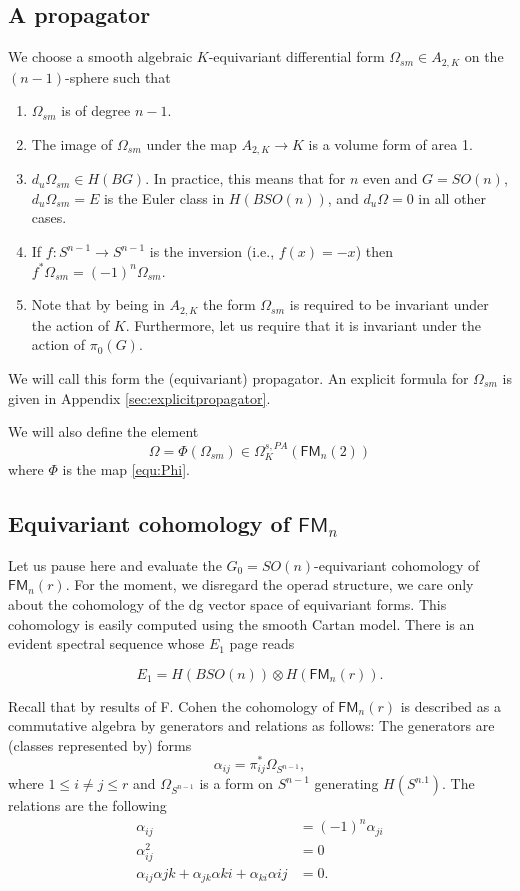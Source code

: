 \documentclass[a4paper]{amsart}
\theoremstyle{plain}
\theoremstyle{definition}
\newcommand{\FM}{\mathsf{FM}}
\newcommand{\SO}{\mathit{SO}}
\newcommand{\beq}[1]{
\begin{equation}\label{#1}
}
\newcommand{\eeq}{
\end{equation}
}
\begin{document}
\subsection{A propagator}\label{sec:propagator}
We choose a smooth algebraic $K$-equivariant differential form $\Omega_{sm}\in A_{2,K}$ on the $(n-1)$-sphere such that
\begin{enumerate}
\item $\Omega_{sm}$ is of degree $n-1$.
\item The image of $\Omega_{sm}$ under the map $A_{2,K}\to K$ is a volume form of area 1.
\item $d_u\Omega_{sm}\in H(BG)$. In practice, this means that for $n$ even and $G=\SO(n)$, $d_u\Omega_{sm}=E$ is the Euler class in $H(B\SO(n))$, and $d_u\Omega=0$ in all other cases.
\item If $f:S^{n-1}\to S^{n-1}$ is the inversion (i.e., $f(x)=-x$) then $f^*\Omega_{sm}=(-1)^{n}\Omega_{sm}$.
\item Note that by being in $A_{2,K}$ the form $\Omega_{sm}$ is required to be invariant under the action of $K$. Furthermore, let us require that it is invariant under the action of $\pi_0(G)$.
\end{enumerate}
We will call this form the (equivariant) propagator.
An explicit formula for $\Omega_{sm}$ is given in Appendix \ref{sec:explicitpropagator}.

We will also define the element 
\[
 \Omega = \Phi(\Omega_{sm}) \in \Omega_K^{s,PA}(\FM_n(2))
\]
where $\Phi$ is the map \eqref{equ:Phi}.


\newcommand{\Grav}{\mathsf{Grav}}
\subsection{Equivariant cohomology of \texorpdfstring{$\FM_n$}{FMn}}
Let us pause here and evaluate the $G_0=\SO(n)$-equivariant cohomology of $\FM_n(r)$.
For the moment, we disregard the operad structure, we care only about the cohomology of the dg vector space of equivariant forms.
This cohomology is easily computed using the smooth Cartan model.
There is an evident spectral sequence whose $E_1$ page reads
\beq{equ:E1equiv}
 E_1 = H(B\SO(n))\otimes H(\FM_n(r)).
\eeq
Recall that by results of F. Cohen the cohomology of $\FM_n(r)$ is described as a commutative algebra by generators and relations as follows:
The generators are (classes represented by) forms 
\[
 \alpha_{ij} = \pi_{ij}^* \Omega_{S^{n-1}},
\]
where $1\leq i\neq j\leq r$ and $\Omega_{S^{n-1}}$ is a form on $S^{n-1}$ generating $H(S^{n.1})$.
The relations are the following
\begin{align*}
 \alpha_{ij}&=(-1)^n\alpha_{ji}
\\
\alpha_{ij}^2&=0
\\
\alpha_{ij}\alpha{jk}+\alpha_{jk}\alpha{ki}+\alpha_{ki}\alpha{ij}&=0.
\end{align*}
\end{document}
